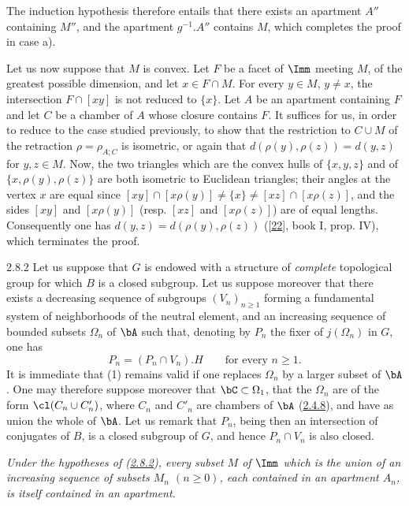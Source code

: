\documentclass[12pt,a4paper,oneside,english]{smfart}
\makeatletter
\newcommand{\btanchor}[1]{\leavevmode\Hy@raisedlink{\hypertarget{bt:#1}{}}}
\newcommand{\btpageanchor}[1]{\Hy@raisedlink{\hypertarget{p:#1}{}}}
\newcommand{\btref}[1]{\hyperlink{bt:#1}{#1}}
\newcommand{\btbib}[1]{\hyperlink{bib:#1}{#1}}
\newcommand{\btpage}[1]{\marginnote{p.~#1}\btpageanchor{#1}}
\newcommand{\pagemark}[1]{\btpage{#1}}
\theoremstyle{definition}
\theoremstyle{bt}
\makeatother
\begin{document}
The induction hypothesis therefore entails that there exists an apartment
$A''$ containing $M''$, and the apartment $g^{-1}.A''$ contains $M$, which
completes the proof in case a).

Let us now suppose that $M$ is convex. Let $F$ be a facet of $\Imm$ meeting
$M$, of the greatest possible dimension, and let $x\in F\cap M$. For every
$y\in M$, $y\neq x$, the intersection $F\cap[xy]$ is not reduced to $\{x\}$.
Let $A$ be an apartment containing $F$ and let $C$ be a chamber of $A$ whose
closure contains $F$. It suffices for us, in order to reduce to the case
studied previously, to show that the restriction to $C\cup M$ of the
retraction $\rho=\rho_{A;C}$ is isometric, or again that
$d(\rho(y),\rho(z))=d(y,z)$ for $y,z\in M$. Now, the two triangles which are
the convex hulls of $\{x,y,z\}$ and of $\{x,\rho(y),\rho(z)\}$ are both
isometric to Euclidean triangles; their angles at the vertex $x$ are equal
since $[xy]\cap[x\rho(y)]\neq\{x\}\neq[xz]\cap[x\rho(z)]$, and the sides
$[xy]$ and $[x\rho(y)]$ (resp. $[xz]$ and $[x\rho(z)]$) are
\pagemark{53}
of equal lengths. Consequently one has $d(y,z)=d(\rho(y),\rho(z))$ ([\btbib{22}],
book I, prop. IV), which terminates the proof.

\num{2.8.2}\btanchor{2.8.2}
Let us suppose that $G$ is endowed with a structure of \emph{complete}
topological group for which $B$ is a closed subgroup. Let us suppose moreover
that there exists a decreasing sequence of subgroups $(V_n)_{n\ge 1}$ forming
a fundamental system of neighborhoods of the neutral element, and an
increasing sequence of bounded subsets $\Omega_n$ of $\bA$ such that, denoting
by $P_n$ the fixer of $j(\Omega_n)$ in $G$, one has
\begin{equation}
P_n=(P_n\cap V_n).H\qquad\text{for every }n\ge 1.
\end{equation}
It is immediate that (1) remains valid if one replaces $\Omega_n$ by a larger
subset of $\bA$. One may therefore suppose moreover that
$\bC\subset\Omega_1$, that the $\Omega_n$ are of the form
$\cl(C_n\cup C'_n)$, where $C_n$ and $C'_n$ are chambers of $\bA$ (\btref{2.4.8}), and
have as union the whole of $\bA$. Let us remark that $P_n$, being then an
intersection of conjugates of $B$, is a closed subgroup of $G$, and hence
$P_n\cap V_n$ is also closed.

\btanchor{2.8.3}
\emph{Under the hypotheses of (\btref{2.8.2}), every subset $M$ of $\Imm$ which is the
union of an increasing sequence of subsets $M_n$ $(n\ge 0)$, each contained in
an apartment $A_n$, is itself contained in an apartment.}
\end{document}
